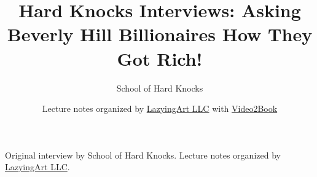 \documentclass[11pt,oneside]{book}
\begin{document}
\frontmatter
\title{Hard Knocks Interviews: Asking Beverly Hill Billionaires How They Got Rich!}
\author{School of Hard Knocks}
\date{Lecture notes organized by \href{https://lazying.art}{LazyingArt LLC} with \href{https://github.com/lachlanchen/Video2Book}{Video2Book}}
\maketitle
\begin{center}
\small Original interview by School of Hard Knocks. Lecture notes organized by \href{https://lazying.art}{LazyingArt LLC}.
\end{center}
\clearpage
\mainmatter

\end{document}
